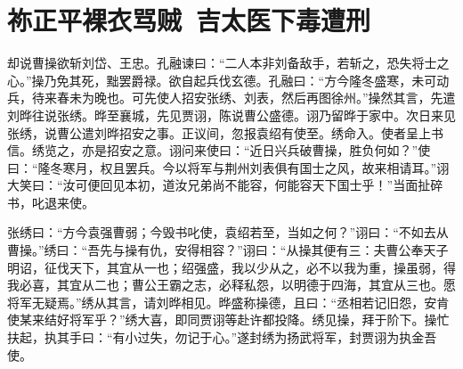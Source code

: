 \chapter{祢正平裸衣骂贼~吉太医下毒遭刑}

却说曹操欲斩刘岱、王忠。孔融谏曰：“二人本非刘备敌手，若斩之，恐失将士之心。”操乃免其死，黜罢爵禄。欲自起兵伐玄德。孔融曰：“方今隆冬盛寒，未可动兵，待来春未为晚也。可先使人招安张绣、刘表，然后再图徐州。”操然其言，先遣刘晔往说张绣。晔至襄城，先见贾诩，陈说曹公盛德。诩乃留晔于家中。次日来见张绣，说曹公遣刘晔招安之事。正议间，忽报袁绍有使至。绣命入。使者呈上书信。绣览之，亦是招安之意。诩问来使曰：“近日兴兵破曹操，胜负何如？”使曰：“隆冬寒月，权且罢兵。今以将军与荆州刘表俱有国士之风，故来相请耳。”诩大笑曰：“汝可便回见本初，道汝兄弟尚不能容，何能容天下国士乎！”当面扯碎书，叱退来使。

张绣曰：“方今袁强曹弱；今毁书叱使，袁绍若至，当如之何？”诩曰：“不如去从曹操。”绣曰：“吾先与操有仇，安得相容？”诩曰：“从操其便有三：夫曹公奉天子明诏，征伐天下，其宜从一也；绍强盛，我以少从之，必不以我为重，操虽弱，得我必喜，其宜从二也；曹公王霸之志，必释私怨，以明德于四海，其宜从三也。愿将军无疑焉。”绣从其言，请刘晔相见。晔盛称操德，且曰：“丞相若记旧怨，安肯使某来结好将军乎？”绣大喜，即同贾诩等赴许都投降。绣见操，拜于阶下。操忙扶起，执其手曰：“有小过失，勿记于心。”遂封绣为扬武将军，封贾诩为执金吾使。

